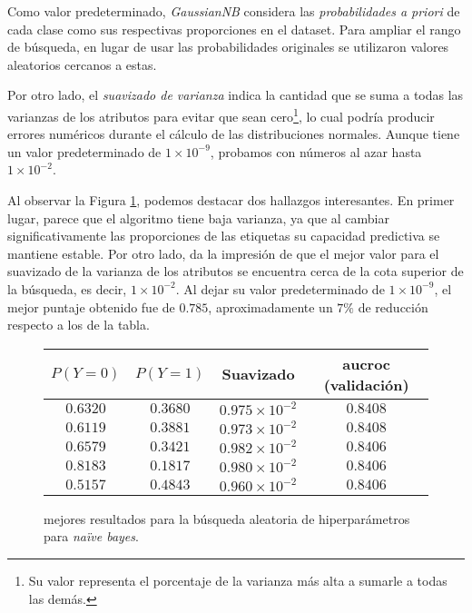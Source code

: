 Como valor predeterminado, \textit{GaussianNB} considera las \textit{probabilidades a priori} de cada clase como sus respectivas proporciones en el dataset. Para ampliar el rango de búsqueda, en lugar de usar las probabilidades originales se utilizaron valores aleatorios cercanos a estas.

Por otro lado, el \textit{suavizado de varianza} indica la cantidad que se suma a todas las varianzas de los atributos para evitar que sean cero\footnote{Su valor representa el porcentaje de la varianza más alta a sumarle a todas las demás.}, lo cual podría producir errores numéricos durante el cálculo de las distribuciones normales. Aunque tiene un valor predeterminado de $1 \times 10^{-9}$, probamos con números al azar hasta $1 \times 10^{-2}$.

Al observar la Figura \ref{naive_bayes}, podemos destacar dos hallazgos interesantes. En primer lugar, parece que el algoritmo tiene baja varianza, ya que al cambiar significativamente las proporciones de las etiquetas su capacidad predictiva se mantiene estable. Por otro lado, da la impresión de que el mejor valor para el suavizado de la varianza de los atributos se encuentra cerca de la cota superior de la búsqueda, es decir, $1 \times 10^{-2}$. Al dejar su valor predeterminado de $1 \times 10^{-9}$, el mejor puntaje obtenido fue de $0.785$, aproximadamente un $7\%$ de reducción respecto a los de la tabla.

\vspace{0.5em}
\begin{figure}[!htbp]
    \begin{center}
        \begin{tabular}{ |c|c|c|c| } 
         \hline
        $P(Y=0)$ & $P(Y=1)$ & Suavizado & aucroc (validación) \\
        \hline
        $0.6320$ & $0.3680$ & $0.975 \times 10^{-2}$ & $0.8408$ \\ 
        $0.6119$ & $0.3881$ & $0.973 \times 10^{-2}$ & $0.8408$  \\
        $0.6579$ & $0.3421$ & $0.982 \times 10^{-2}$ & $0.8406$  \\ 
        $0.8183$ & $0.1817$ & $0.980 \times 10^{-2}$ & $0.8406$  \\
        $0.5157$ & $0.4843$ & $0.960 \times 10^{-2}$ & $0.8406$  \\ 
        \hline
        \end{tabular}
    \end{center}
    \caption{mejores resultados para la búsqueda aleatoria de hiperparámetros para \textit{naïve bayes}.} \label{naive_bayes}
\end{figure}

